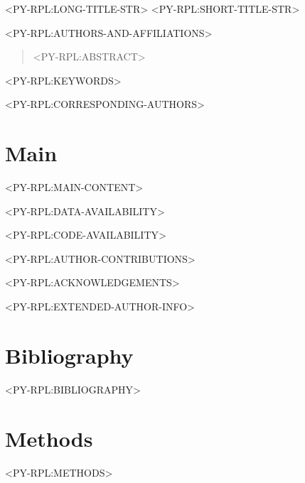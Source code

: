 \documentclass[times, twoside]{rxiv_maker_style}
\begin{document}
<PY-RPL:LONG-TITLE-STR>
<PY-RPL:SHORT-TITLE-STR>

<PY-RPL:AUTHORS-AND-AFFILIATIONS>

\maketitle

\begin{abstract}

<PY-RPL:ABSTRACT>

\end{abstract}

<PY-RPL:KEYWORDS>

<PY-RPL:CORRESPONDING-AUTHORS>

\section*{Main}
<PY-RPL:MAIN-CONTENT>

\vspace{1em}

\begin{data}
<PY-RPL:DATA-AVAILABILITY>
\end{data}

\begin{code}
<PY-RPL:CODE-AVAILABILITY>
\end{code}

\begin{contributions}
<PY-RPL:AUTHOR-CONTRIBUTIONS>
\end{contributions}

\begin{acknowledgements}
<PY-RPL:ACKNOWLEDGEMENTS>
\end{acknowledgements}

\begin{exauthor}
<PY-RPL:EXTENDED-AUTHOR-INFO>
\end{exauthor}

\section*{Bibliography}
<PY-RPL:BIBLIOGRAPHY>

\section*{Methods}
<PY-RPL:METHODS>

\onecolumn
\newpage




\end{document}
